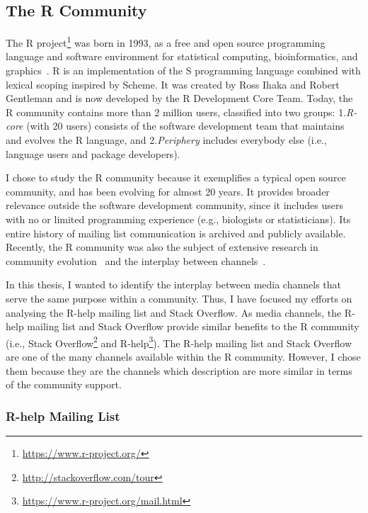 \documentclass{sig-alternate-05-2015}
\begin{document}
\subsection{The R Community}

	The R project\footnote{\url{https://www.r-project.org/}} was born in 1993, as a free and open source programming language and software environment for statistical computing, bioinformatics, and graphics~\cite{Ihaka1996}. 
	R is an implementation of the S programming language combined with lexical scoping inspired by Scheme. 
	It was created by Ross Ihaka and Robert Gentleman and is now developed by the R Development Core Team.
	Today, the R community contains more than 2 million users, classified into two groups: 1.\textit{R-core} (with 20 users) consists of the software development team that maintains and evolves the R language, and 2.\textit{Periphery} includes everybody else (i.e., language users and package developers).

	I chose to study the R community because it exemplifies a typical open source community, and has been evolving for almost 20 years. 
	It provides broader relevance outside the software development community, since it includes users with no or limited programming experience (e.g., biologists or statisticians). 
	Its entire history of mailing list communication is archived and publicly available.
	Recently, the R community was also the subject of extensive research in community evolution~\cite{German2013} and the interplay between channels~\cite{Vasilescu2014c}. 

	In this thesis, I wanted to identify the interplay between media channels that serve the same purpose within a community. 
	Thus, I have focused my efforts on analysing the R-help mailing list and Stack Overflow.
	As media channels, the R-help mailing list and Stack Overflow provide similar benefits to the R community (i.e., Stack Overflow\footnote{\url{http://stackoverflow.com/tour}} and R-help\footnote{\url{https://www.r-project.org/mail.html}}).
	The R-help mailing list and Stack Overflow are one of the many channels available within the R community.
	However, I chose them because they are the channels which description are more similar in terms of the community support.

\subsubsection{R-help Mailing List}
\end{document}
